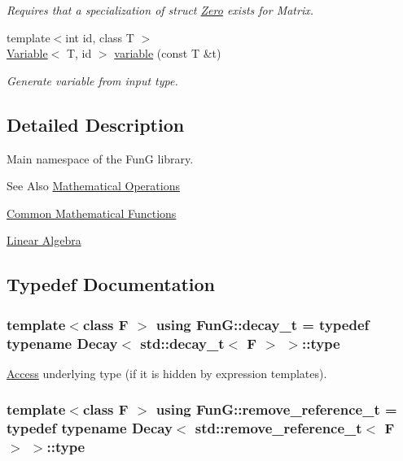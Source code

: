 \begin{DoxyCompactItemize}
\begin{DoxyCompactList}\small\item\em Requires that a specialization of struct \hyperlink{structFunG_1_1Zero}{Zero} exists for Matrix. \end{DoxyCompactList}\item 
{\footnotesize template$<$int id, class T $>$ }\\\hyperlink{structFunG_1_1Variable}{Variable}$<$ T, id $>$ \hyperlink{namespaceFunG_a2ead025b35a8cdf3ac8c170524ab61c0}{variable} (const T \&t)
\begin{DoxyCompactList}\small\item\em Generate variable from input type. \end{DoxyCompactList}\end{DoxyCompactItemize}


\subsection{Detailed Description}
Main namespace of the Fun\-G library. \begin{DoxySeeAlso}{See Also}
\hyperlink{group__MathematicalOperationsGroup}{Mathematical Operations} 

\hyperlink{group__CMathGroup}{Common Mathematical Functions} 

\hyperlink{group__LinearAlgebraGroup}{Linear Algebra} 
\end{DoxySeeAlso}


\subsection{Typedef Documentation}
\hypertarget{namespaceFunG_a7ff91644f18a190ac3d4fc9e970ebe2e}{
\subsubsection[{decay\-\_\-t}]{\setlength{\rightskip}{0pt plus 5cm}template$<$class F $>$ using {\bf Fun\-G\-::decay\-\_\-t} = typedef typename {\bf Decay}$<$ std\-::decay\-\_\-t$<$ F $>$ $>$\-::type}}\label{namespaceFunG_a7ff91644f18a190ac3d4fc9e970ebe2e}


\hyperlink{namespaceFunG_1_1Access}{Access} underlying type (if it is hidden by expression templates). 

\hypertarget{namespaceFunG_a40f6d0896c1e3837d442d39418a4f609}{
\subsubsection[{remove\-\_\-reference\-\_\-t}]{\setlength{\rightskip}{0pt plus 5cm}template$<$class F $>$ using {\bf Fun\-G\-::remove\-\_\-reference\-\_\-t} = typedef typename {\bf Decay}$<$ std\-::remove\-\_\-reference\-\_\-t$<$ F $>$ $>$\-::type}}\label{namespaceFunG_a40f6d0896c1e3837d442d39418a4f609}


